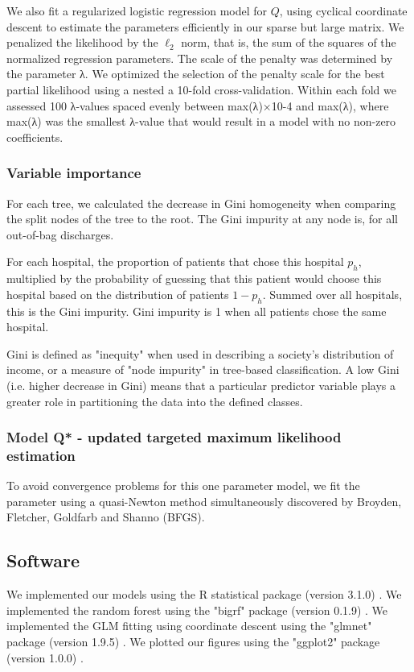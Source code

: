 \documentclass[]{article}\usepackage[]{graphicx}\usepackage[]{color}
\begin{document}
We also fit a regularized logistic regression model for \(Q\), using cyclical coordinate descent to estimate the parameters efficiently in our sparse but large matrix. We penalized the likelihood by the \(\ell_2\) norm, that is, the sum of the squares of the normalized regression parameters. The scale of the penalty was determined by the parameter λ. We optimized the selection of the penalty scale for the best partial likelihood using a nested a 10-fold cross-validation. Within each fold we assessed 100 λ-values spaced evenly between max(λ)×10-4 and max(λ), where max(λ) was the smallest λ-value that would result in a model with no non-zero coefficients.

\subsubsection{Variable importance}
For each tree, we calculated the decrease in Gini homogeneity when comparing the split nodes of the tree to the root. 
The Gini impurity at any node is, for all out-of-bag discharges.

For each hospital, the proportion of patients that chose this hospital $p_h$, multiplied by the probability of guessing that this patient would choose this hospital based on the distribution of patients $1-p_h$. Summed over all hospitals, this is the Gini impurity. Gini impurity is 1 when all patients chose the same hospital.

Gini is defined as "inequity" when used in describing a society's distribution of income, or a measure of "node impurity" in tree-based classification. A low Gini (i.e. higher decrease in Gini) means that a particular predictor variable plays a greater role in partitioning the data into the defined classes. 


\subsubsection{Model Q* - updated targeted maximum likelihood estimation}

To avoid convergence problems for this one parameter model, we fit the parameter using a quasi-Newton method simultaneously discovered by Broyden\cite{broyden_convergence_1970}, Fletcher\cite{fletcher_new_1970}, Goldfarb\cite{goldfarb_family_1970} and Shanno\cite{shanno_conditioning_1970} (BFGS).


\subsection{Software}
We implemented our models using the R statistical package (version 3.1.0) \cite{team_r:_2014}. We implemented the random forest using the "bigrf" package (version 0.1.9) \cite{lim_bigrf:_2014}. We implemented the GLM fitting using coordinate descent using the "glmnet" package (version 1.9.5) \cite{friedman_regularization_2010}. We plotted our figures using the "ggplot2" package (version 1.0.0) \cite{wickham_ggplot2:_2009}.
\end{document}
